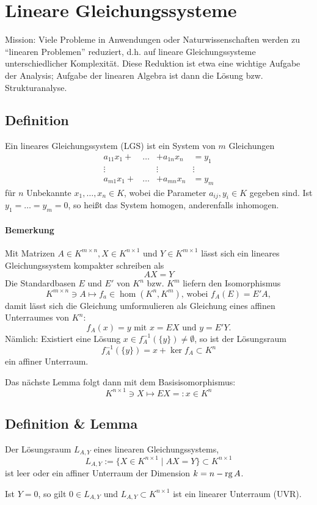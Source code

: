 \section{Lineare Gleichungssysteme}
	Mission: Viele Probleme in Anwendungen oder Naturwissenschaften werden zu "`linearen Problemen"' reduziert, d.h. auf lineare Gleichungssysteme unterschiedlicher Komplexität.
	Diese Reduktion ist etwa eine wichtige Aufgabe der Analysis; Aufgabe der linearen Algebra ist dann die Lösung bzw. Strukturanalyse.
\subsection{Definition}
	\begin{Definition}
	Ein lineares Gleichungssystem (LGS) ist ein System von $ m $ Gleichungen
		\[ \begin{array}{cccc}
		a_{11}x_1+&\dots &+ a_{1n}x_n &=y_1\\
		\vdots & &\vdots & \vdots\\
		a_{m1}x_1 +& \dots &+a_{mn}x_n &= y_m
		\end{array} \]
	für $ n $ Unbekannte $ x_1,\dots,x_n\in K $, wobei die Parameter $ a_{ij},y_i\in K $ gegeben sind. Ist $ y_1 = \dots = y_m = 0 $, so heißt das System homogen, anderenfalls inhomogen.
	\end{Definition}
\paragraph{Bemerkung}
	Mit Matrizen $ A\in K^{m\times n},X\in K^{n\times 1} $ und $ Y\in K^{m\times 1} $ lässt sich ein lineares Gleichungssystem kompakter schreiben als
		\[ AX = Y \]
	Die Standardbasen $ E $ und $ E' $ von $ K^n $ bzw. $ K^m $ liefern den Isomorphismus
		\[ K^{m\times n}\ni A\mapsto f_a\in \hom(K^n,K^m)\text{, wobei }f_A(E) = E'A, \]
	damit lässt sich die Gleichung umformulieren als Gleichung eines affinen Unterraumes von $ K^n: $
		\[ f_A(x) = y \text{ mit } x=EX \text{ und } y=E'Y. \]
	Nämlich: Existiert eine Lösung $ x\in f_A^{-1}(\{y\})\neq \emptyset $, so ist der Lösungsraum
		\[ f_A^{-1}(\{y\}) = x+\ker f_A\subset K^n \]
	ein affiner Unterraum.
	
	Das nächste Lemma folgt dann mit dem Basisisomorphismus:
		\[ K^{n\times 1} \ni X \mapsto EX =: x\in K^n \]
\subsection{Definition \& Lemma}
	\begin{Lemma}[Lösungsraum]
	Der Lösungsraum $ L_{A,Y} $ eines linearen Gleichungssystems,
		\[ L_{A,Y}:=\{X\in K^{n\times 1}\mid AX=Y\}\subset K^{n\times 1} \]
	ist leer oder ein affiner Unterraum der Dimension $ k = n-\operatorname{rg} A $.
	
	Ist $ Y = 0 $, so gilt $ 0\in L_{A,Y} $ und $ L_{A,Y}\subset K^{n\times 1} $ ist ein linearer Unterraum (UVR).
	\end{Lemma}
